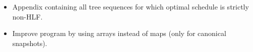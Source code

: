 \documentclass[a4paper, 11pt]{report}
\begin{document}
\begin{itemize}
\item Appendix containing all tree sequences for which optimal schedule is strictly non-HLF.
\item Improve program by using arrays instead of maps (only for canonical snapshots).  
\end{itemize}

%
%
%
%
%
%
%














\appendix{}

%

%
\nocite{*}
\printbibliography[notkeyword=oeis,title={Bibliography}]
\end{document}
